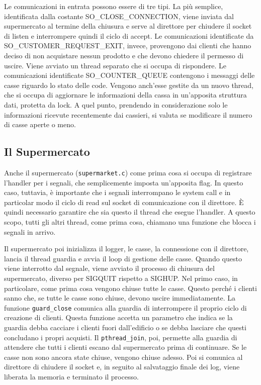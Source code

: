 \documentclass[a4paper,11pt] {article}
\begin{document}
Le comunicazioni in entrata possono essere di tre tipi. La più semplice, identificata dalla costante SO\_CLOSE\_CONNECTION, viene inviata dal supermercato al termine della chiusura e serve al direttore per chiudere il socket di listen e interrompere quindi il ciclo di accept. Le comunicazioni identificate da SO\_CUSTOMER\_REQUEST\_EXIT, invece, provengono dai clienti che hanno deciso di non acquistare nessun prodotto e che devono chiedere il permesso di uscire. Viene avviato un thread separato che si occupa di rispondere. Le comunicazioni identificate SO\_COUNTER\_QUEUE contengono i messaggi delle casse riguardo lo stato delle code. Vengono anch'esse gestite da un nuovo thread, che si occupa di aggiornare le informazioni della cassa in un'apposita struttura dati, protetta da lock. A quel punto, prendendo in considerazione solo le informazioni ricevute recentemente dai cassieri, si valuta se modificare il numero di casse aperte o meno.

\subsection*{Il Supermercato}

Anche il supermercato (\lstinline{supermarket.c}) come prima cosa si occupa di registrare l'handler per i segnali, che semplicemente imposta un'apposita flag. In questo caso, tuttavia, è importante che i segnali interrompano le system call e in particolar modo il ciclo di read sul socket di comunicazione con il direttore. È quindi necessario garantire che sia questo il thread che esegue l'handler. A questo scopo, tutti gli altri thread, come prima cosa, chiamano una funzione che blocca i segnali in arrivo.

Il supermercato poi inizializza il logger, le casse, la connessione con il direttore, lancia il thread guardia e avvia il loop di gestione delle casse. Quando questo viene interrotto dal segnale, viene avviato il processo di chiusura del supermercato, diverso per SIGQUIT rispetto a SIGHUP. Nel primo caso, in particolare, come prima cosa vengono chiuse tutte le casse. Questo perché i clienti sanno che, se tutte le casse sono chiuse, devono uscire immediatamente. La funzione \lstinline{guard_close} comunica alla guardia di interrompere il proprio ciclo di creazione di clienti. Questa funzione accetta un parametro che indica se la guardia debba cacciare i clienti fuori dall'edificio o se debba lasciare che questi concludano i propri acquisti. Il \lstinline{pthread_join}, poi, permette alla guardia di attendere che tutti i clienti escano dal supermercato prima di continuare. Se le casse non sono ancora state chiuse, vengono chiuse adesso. Poi si comunica al direttore di chiudere il socket e, in seguito al salvataggio finale dei log, viene liberata la memoria e terminato il processo.
\end{document}
